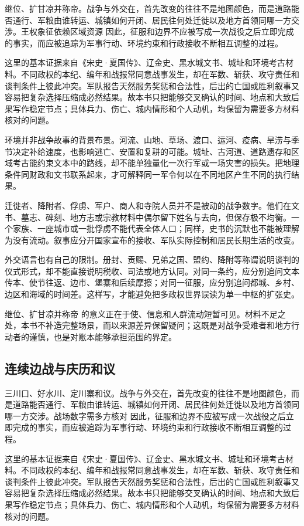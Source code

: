 继位、扩甘凉并称帝。战争与外交在，首先改变的往往不是地图颜色，而是道路能否通行、军粮由谁转运、城镇如何开闭、居民往何处迁徙以及地方首领同哪一方交涉。王权象征依赖区域资源 因此，征服和边界不应被写成一次战役之后立即完成的事实，而应被追踪为军事行动、环境约束和行政接收不断相互调整的过程。

这里的基本证据来自《宋史·夏国传》、辽金史、黑水城文书、城址和环境考古材料。不同政权的本纪、编年和战报常同意战事发生，却在军数、斩获、攻守责任和谈判条件上彼此冲突。军队报告天然服务奖惩和合法性，后出的亡国或胜利叙事又容易把复杂选择压缩成必然结果。故本书只把能够交叉确认的时间、地点和大致后果写作稳定节点；具体兵力、伤亡、城内情形和个人动机，均保留为需要多方材料核对的问题。

环境并非战争故事的背景布景。河流、山地、草场、渡口、运河、疫病、旱涝与季节决定补给速度，也影响逃亡、安置和复耕的可能。城址、古河道、道路遗存和区域考古能约束文本中的路线，却不能单独量化一次行军或一场灾害的损失。把地理条件同财政和文书联系起来，才可解释同一军令何以在不同地区产生不同的执行结果。

迁徙者、降附者、俘虏、军户、商人和寺院人员并不是被动的战争数字。他们在文书、墓志、碑刻、地方志或宗教材料中偶尔留下姓名与去向，但保存极不均衡。一个家族、一座城市或一批俘虏不能代表全体人口；同样，史书的沉默也不能被理解为没有流动。叙事应分开国家宣布的接收、军队实际控制和居民长期生活的改变。

外交语言也有自己的限制。册封、贡赐、兄弟之国、盟约、降附等称谓说明谈判的仪式形式，却不能直接说明税收、司法或地方认同。对同一条约，应分别追问文本传本、使节往返、边市、堡寨和后续摩擦；对同一征服，应分别追问都城、乡村、边区和海域的时间差。这样写，才能避免把多政权世界误读为单一中枢的扩张史。

继位、扩甘凉并称帝 的意义正在于使、信息和人群流动短暂可见。材料不足之处，本书不补造完整场景，而以来源差异保留疑问；这既是对战争受难者和地方行动者的谨慎，也是对账本能够承担范围的界定。

\subsection{连续边战与庆历和议}

三川口、好水川、定川寨和议。战争与外交在，首先改变的往往不是地图颜色，而是道路能否通行、军粮由谁转运、城镇如何开闭、居民往何处迁徙以及地方首领同哪一方交涉。战场数字需多方核对 因此，征服和边界不应被写成一次战役之后立即完成的事实，而应被追踪为军事行动、环境约束和行政接收不断相互调整的过程。

这里的基本证据来自《宋史·夏国传》、辽金史、黑水城文书、城址和环境考古材料。不同政权的本纪、编年和战报常同意战事发生，却在军数、斩获、攻守责任和谈判条件上彼此冲突。军队报告天然服务奖惩和合法性，后出的亡国或胜利叙事又容易把复杂选择压缩成必然结果。故本书只把能够交叉确认的时间、地点和大致后果写作稳定节点；具体兵力、伤亡、城内情形和个人动机，均保留为需要多方材料核对的问题。


